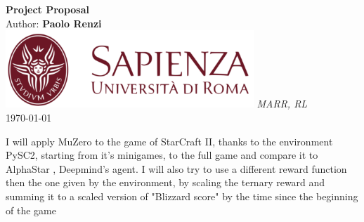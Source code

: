 \documentclass[10pt,a4paper]{article}
\begin{document}
\begin{titlepage}
    \begin{center}
        \vspace*{1cm}
        \Huge\textbf{Project Proposal}\\
        \vspace{1.5cm}
        \Large Author:
        \textbf{Paolo Renzi}\\
        \vspace{0.5cm}
        \vfill
        \includegraphics[width=0.7\textwidth]{images/sapienza_logo.png}
        \vfill
        \vspace{0.8cm}
        \Large \textit{MARR, RL}\\
        \today
    \end{center}
\end{titlepage}
\newpage
I will apply MuZero \cite{Schrittwieser_2020} to the game of StarCraft II, thanks to the environment PySC2\cite{vinyals2017starcraft}, starting from it's minigames, to the full game and compare it to AlphaStar \cite{Arulkumaran_2019}, Deepmind's agent. 
I will also try to use a different reward function then the one given by the environment, by scaling the ternary reward and summing it to a scaled version of "Blizzard score" by the time since the beginning of the game 

\vspace{300pt}

\printbibliography
\end{document}
